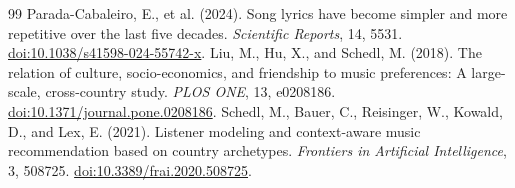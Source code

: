 \documentclass[10pt,a4paper,twocolumn]{article}
\begin{document}
\begin{thebibliography}{99}
 Parada-Cabaleiro, E., et al. (2024). Song lyrics have become simpler and more repetitive over the last five decades. \textit{Scientific Reports}, 14, 5531. \href{https://doi.org/10.1038/s41598-024-55742-x}{doi:10.1038/s41598-024-55742-x}.
 Liu, M., Hu, X., and Schedl, M. (2018). The relation of culture, socio-economics, and friendship to music preferences: A large-scale, cross-country study. \textit{PLOS ONE}, 13, e0208186. \href{https://doi.org/10.1371/journal.pone.0208186}{doi:10.1371/journal.pone.0208186}.
 Schedl, M., Bauer, C., Reisinger, W., Kowald, D., and Lex, E. (2021). Listener modeling and context-aware music recommendation based on country archetypes. \textit{Frontiers in Artificial Intelligence}, 3, 508725. \href{https://doi.org/10.3389/frai.2020.508725}{doi:10.3389/frai.2020.508725}.
\end{thebibliography}
\endgroup
\clearpage
\onecolumn
\end{document}
